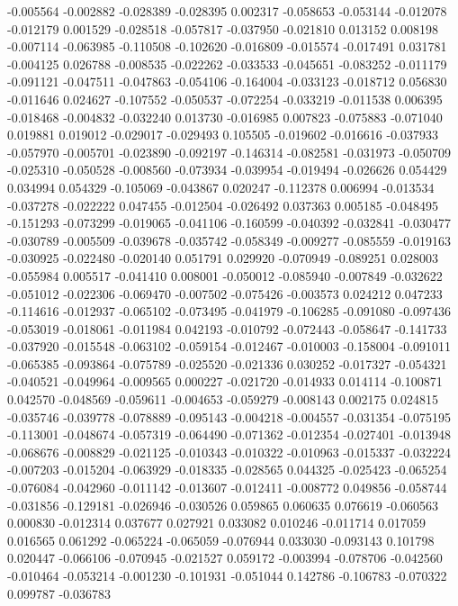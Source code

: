 -0.005564
-0.002882
-0.028389
-0.028395
0.002317
-0.058653
-0.053144
-0.012078
-0.012179
0.001529
-0.028518
-0.057817
-0.037950
-0.021810
0.013152
0.008198
-0.007114
-0.063985
-0.110508
-0.102620
-0.016809
-0.015574
-0.017491
0.031781
-0.004125
0.026788
-0.008535
-0.022262
-0.033533
-0.045651
-0.083252
-0.011179
-0.091121
-0.047511
-0.047863
-0.054106
-0.164004
-0.033123
-0.018712
0.056830
-0.011646
0.024627
-0.107552
-0.050537
-0.072254
-0.033219
-0.011538
0.006395
-0.018468
-0.004832
-0.032240
0.013730
-0.016985
0.007823
-0.075883
-0.071040
0.019881
0.019012
-0.029017
-0.029493
0.105505
-0.019602
-0.016616
-0.037933
-0.057970
-0.005701
-0.023890
-0.092197
-0.146314
-0.082581
-0.031973
-0.050709
-0.025310
-0.050528
-0.008560
-0.073934
-0.039954
-0.019494
-0.026626
0.054429
0.034994
0.054329
-0.105069
-0.043867
0.020247
-0.112378
0.006994
-0.013534
-0.037278
-0.022222
0.047455
-0.012504
-0.026492
0.037363
0.005185
-0.048495
-0.151293
-0.073299
-0.019065
-0.041106
-0.160599
-0.040392
-0.032841
-0.030477
-0.030789
-0.005509
-0.039678
-0.035742
-0.058349
-0.009277
-0.085559
-0.019163
-0.030925
-0.022480
-0.020140
0.051791
0.029920
-0.070949
-0.089251
0.028003
-0.055984
0.005517
-0.041410
0.008001
-0.050012
-0.085940
-0.007849
-0.032622
-0.051012
-0.022306
-0.069470
-0.007502
-0.075426
-0.003573
0.024212
0.047233
-0.114616
-0.012937
-0.065102
-0.073495
-0.041979
-0.106285
-0.091080
-0.097436
-0.053019
-0.018061
-0.011984
0.042193
-0.010792
-0.072443
-0.058647
-0.141733
-0.037920
-0.015548
-0.063102
-0.059154
-0.012467
-0.010003
-0.158004
-0.091011
-0.065385
-0.093864
-0.075789
-0.025520
-0.021336
0.030252
-0.017327
-0.054321
-0.040521
-0.049964
-0.009565
0.000227
-0.021720
-0.014933
0.014114
-0.100871
0.042570
-0.048569
-0.059611
-0.004653
-0.059279
-0.008143
0.002175
0.024815
-0.035746
-0.039778
-0.078889
-0.095143
-0.004218
-0.004557
-0.031354
-0.075195
-0.113001
-0.048674
-0.057319
-0.064490
-0.071362
-0.012354
-0.027401
-0.013948
-0.068676
-0.008829
-0.021125
-0.010343
-0.010322
-0.010963
-0.015337
-0.032224
-0.007203
-0.015204
-0.063929
-0.018335
-0.028565
0.044325
-0.025423
-0.065254
-0.076084
-0.042960
-0.011142
-0.013607
-0.012411
-0.008772
0.049856
-0.058744
-0.031856
-0.129181
-0.026946
-0.030526
0.059865
0.060635
0.076619
-0.060563
0.000830
-0.012314
0.037677
0.027921
0.033082
0.010246
-0.011714
0.017059
0.016565
0.061292
-0.065224
-0.065059
-0.076944
0.033030
-0.093143
0.101798
0.020447
-0.066106
-0.070945
-0.021527
0.059172
-0.003994
-0.078706
-0.042560
-0.010464
-0.053214
-0.001230
-0.101931
-0.051044
0.142786
-0.106783
-0.070322
0.099787
-0.036783
